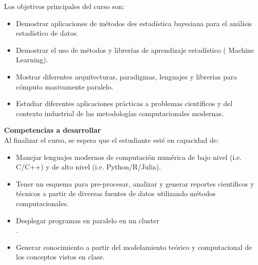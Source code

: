\documentclass[letterpaper,10pt,onecolumn]{article}
\begin{document}
\noindent\normalsize Los objetivos principales del curso son:

\begin{itemize}

  \item Demostrar aplicaciones de m\'etodos des estad\'istica bayesiana para el an\'alisis estad\'istico de datos. \\ [-0.6cm]
        \item Demostrar el uso de m\'etodos y librer\'ias de aprendizaje estad\'istico ( Machine
          Learning). \\[-0.6cm]
        \item Mostrar diferentes arquitecturas, paradigmas, lenguajes
          y librerias para c\'omputo masivamente paralelo.  \\[-0.6cm]
	\item Estudiar diferentes aplicaciones prácticas a problemas
          científicos y del contexto industrial de las metodologías
          computacionales modernas. \\[-0.6cm] 
\end{itemize}

\noindent\textbf{\large {} \quad Competencias a
  desarrollar}\\[-0.2cm] 


\noindent\normalsize Al finalizar el curso, se espera que el
estudiante est\'e en capacidad de: 

\begin{itemize}
\item Manejar lenguajes modernos de computación numérica de
  bajo nivel (i.e. C/C++) y de alto nivel
  (i.e. Python/R/Julia). \\[-0.6cm]
\item Tener un esquema para pre-procesar, analizar y generar
  reportes científicos y técnicos a partir de diversas fuentes
  de datos utilizando métodos computacionales. \\[-0.6cm] 
\item Desplegar programas en paralelo en un cluster \\[-0.6cm].
\item Generar conocimiento a partir del modelamiento te\'orico
  y computacional de los conceptos vistos en clase.\\[-0.2cm]  
\end{itemize}
\end{document}
